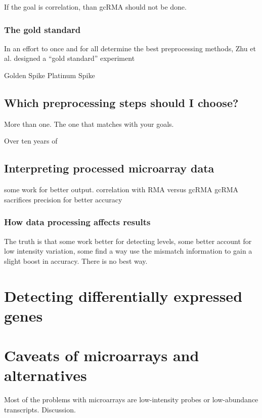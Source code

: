 If the goal is correlation, than gcRMA should not be done.


\subsubsection{The gold standard}

In an effort to once and for all determine the best
preprocessing methods, Zhu et al. designed a ``gold standard''
experiment



Golden Spike
Platinum Spike



\subsection{Which preprocessing steps should I choose?}

More than one. The one that matches with your goals.

Over ten years of 

\subsection{Interpreting processed microarray data}

some work for better output. correlation with RMA versus gcRMA
gcRMA sacrifices precision for better accuracy

\subsubsection{How data processing affects results}

The truth is that some work better for detecting levels, some
better account for low intensity variation, some find a way use the mismatch
information to gain a slight boost in accuracy. There is no best way.



\section[Differential expression]{Detecting differentially expressed genes}


\section{Caveats of microarrays and alternatives}

Most of the problems with microarrays are low-intensity probes or
low-abundance transcripts. Discussion.

